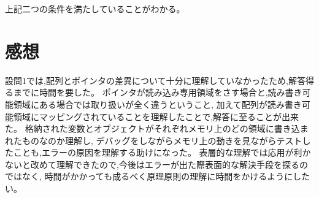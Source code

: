\documentclass[fontsize = 10pt, paper= a4,twocolumn,column_gap=3zw]{jlreq}
\begin{document}
上記二つの条件を満たしていることがわかる。

\section{感想}
設問1では,配列とポインタの差異について十分に理解していなかったため,解答得るまでに時間を要した。
ポインタが読み込み専用領域をさす場合と,読み書き可能領域にある場合では取り扱いが全く違うということ,
加えて配列が読み書き可能領域にマッピングされていることを理解したことで\cite{rita},解答に至ることが出来た。
格納された変数とオブジェクトがそれぞれメモリ上のどの領域に書き込まれたものなのか理解し,
デバッグをしながらメモリ上の動きを見ながらテストしたことも,エラーの原因を理解する助けになった。
表層的な理解では応用が利かないと改めて理解できたので,今後はエラーが出た際表面的な解決手段を探るのではなく,
時間がかかっても成るべく原理原則の理解に時間をかけるようにしたい。



\end{document}
